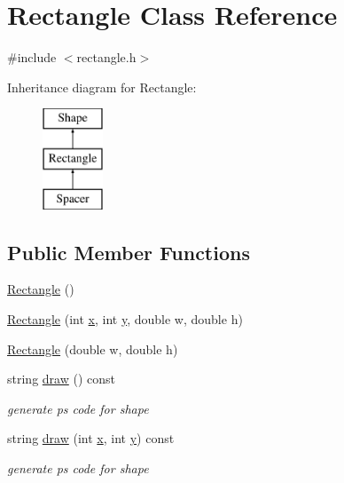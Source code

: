 \hypertarget{class_rectangle}{}\section{Rectangle Class Reference}
\label{class_rectangle}


{\ttfamily \#include $<$rectangle.\+h$>$}

Inheritance diagram for Rectangle\+:\begin{figure}[H]
\begin{center}
\leavevmode
\includegraphics[height=3.000000cm]{class_rectangle}
\end{center}
\end{figure}
\subsection*{Public Member Functions}
\begin{DoxyCompactItemize}
\item 
\hyperlink{class_rectangle_a8a933e0ebd9e80ce91e61ffe87fd577e}{Rectangle} ()
\item 
\hyperlink{class_rectangle_a1dc8d8db9c867aa80616837bd980fd78}{Rectangle} (int \hyperlink{class_shape_a41e403e73d2949f1a6adfba6032c41ec}{x}, int \hyperlink{class_shape_ac757f715cc5b5681f2c691663ac06f0a}{y}, double w, double h)
\item 
\hyperlink{class_rectangle_a361b04e1812db6a4774273d18198f65d}{Rectangle} (double w, double h)
\item 
string \hyperlink{class_rectangle_add9328727ce45f2782971385343a4ea1}{draw} () const 
\begin{DoxyCompactList}\small\item\em generate ps code for shape \end{DoxyCompactList}\item 
string \hyperlink{class_rectangle_ac1cd2c2307b24d001171361f95ea214f}{draw} (int \hyperlink{class_shape_a41e403e73d2949f1a6adfba6032c41ec}{x}, int \hyperlink{class_shape_ac757f715cc5b5681f2c691663ac06f0a}{y}) const 
\begin{DoxyCompactList}\small\item\em generate ps code for shape \end{DoxyCompactList}\end{DoxyCompactItemize}

